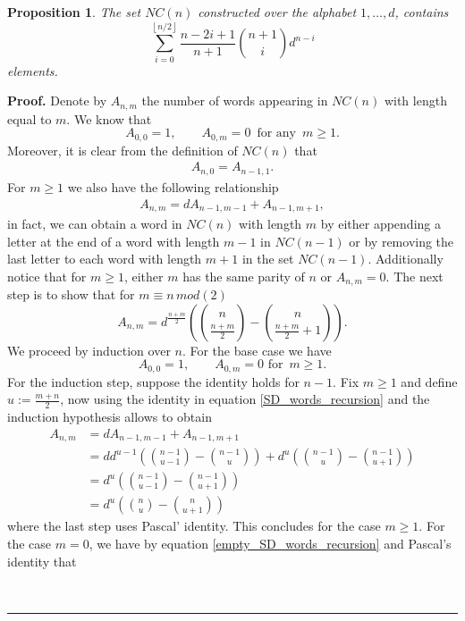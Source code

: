 \documentclass{article}%
\newtheorem{proposition}[theorem]{Proposition}
\newenvironment{proof}[1][Proof]{\noindent\textbf{#1.} }{\ \rule{0.5em}{0.5em}}
\newcommand{\floor}[1]{\left \lfloor {#1}\right \rfloor}
\begin{document}
\begin{proposition}
    The set $NC(n)$ constructed over the alphabet $1, \dots, d$, contains 
    \[
    \sum_{i = 0}^{\floor{n/2}} \frac{n -2i +1}{n+1} \binom{n+1}{i} d^{n - i}
    \] 
    elements.
\end{proposition}
\begin{proof}
Denote by $A_{n,m}$ the number of words appearing in $NC(n)$ with length equal to $m$. We know that
\[
A_{0, 0} = 1, \qquad A_{0, m} = 0 \, \text{ for any } \, m \geq 1. 
\]
Moreover, it is clear from the definition of $NC(n)$ that 
\begin{align}\label{empty_SD_words_recursion}
A_{n, 0} = A_{n-1, 1}.
\end{align}
For $m \geq 1$ we also have the following relationship
\begin{align} \label{SD_words_recursion}
    A_{n, m} = d A_{n-1, m-1} + A_{n-1, m+1},
\end{align}
in fact, we can obtain a word in $NC(n)$ with length $m$ by either appending a letter at the end of a word with length $m-1$ in $NC(n-1)$
or by removing the last letter to each word with length $m+1$ in the set $NC(n-1)$.\newline
Additionally notice that for $m\geq1$, either $m$ has the same parity of $n$ or $A_{n,m} = 0$.\newline
The next step is to show that for $m \equiv n \, mod(2)$
\[
A_{n, m} = d^{\frac{n+m}{2}} \left( \binom{n}{\frac{n+m}{2}} - \binom{n}{\frac{n+m}{2} + 1}  \right).
\] 
We proceed by induction over $n$. For the base case we have 
\[
A_{0,0} = 1, \qquad A_{0,m} = 0 \text{ for }\, m \geq 1. 
\]
For the induction step, suppose the identity holds for $n-1$. Fix $m \geq 1$ and define 
$u :=  \frac{m +n}{2}$, now using the identity in equation \eqref{SD_words_recursion} and the induction hypothesis allows to obtain 
\begin{align*}
    A_{n,m} &= d A_{n-1, m-1} + A_{n-1, m+1} \\
            &= d d^{u-1} \left( \binom{n-1}{u-1} - \binom{n-1}{u} \right) + d^u\left( \binom{n-1}{u} - \binom{n-1}{u+1} \right) \\
            &= d^u\left( \binom{n-1}{u-1} - \binom{n-1}{u+1} \right) \\
            &= d^u\left( \binom{n}{u} - \binom{n}{u+1} \right)
\end{align*}
where the last step uses Pascal' identity.
This concludes for the case $m \geq 1$. 
For the case $m = 0$, we have by equation \eqref{empty_SD_words_recursion} and Pascal's identity that

\end{proof}
\end{document}
